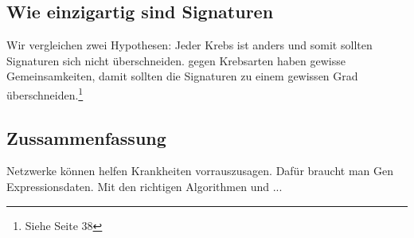 \documentclass{article}
\begin{document}
\subsection{Wie einzigartig sind Signaturen}
Wir vergleichen zwei Hypothesen: Jeder Krebs ist anders und somit sollten Signaturen sich nicht überschneiden. gegen Krebsarten haben gewisse Gemeinsamkeiten, damit sollten die Signaturen zu einem gewissen Grad überschneiden.\footnote{Siehe Seite 38}
\subsection{Zussammenfassung}
Netzwerke können helfen Krankheiten vorrauszusagen. Dafür braucht man Gen Expressionsdaten. Mit den richtigen Algorithmen und ... 
\end{document}
